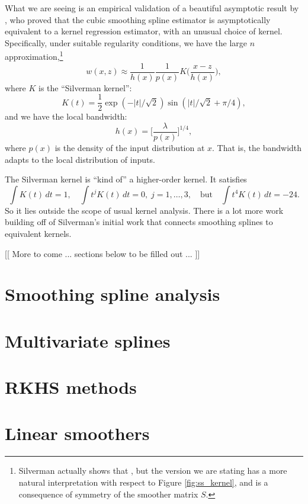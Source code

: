 \documentclass{article}
\begin{document}
What we are seeing is an empirical validation of a beautiful asymptotic result
by \citet{silverman1984spline}, who proved that the cubic smoothing spline
estimator is asymptotically equivalent to a kernel regression estimator, with an 
unusual choice of kernel. Specifically, under suitable regularity conditions, we
have the large $n$ approximation,\footnote{Silverman actually shows that
  , but the version we are stating has a more natural interpretation
  with respect to Figure \ref{fig:ss_kernel}, and is a consequence of symmetry
  of the smoother matrix $S$.} 
\[
w(x, z) \approx \frac{1}{h(x)} \frac{1}{p(x)} K\bigg( \frac{x-z}{h(x)} \bigg), 
\]
where $K$ is the ``Silverman kernel'': 
\[
K(t) = \frac{1}{2} \exp(-|t|/\sqrt{2}) \sin(|t|/\sqrt{2} + \pi/4), 
\]
and we have the local bandwidth: 
\[
h(x) = \bigg[ \frac{\lambda}{p(x)} \bigg]^{1/4},
\]
where $p(x)$ is the density of the input distribution at $x$. That is, the
bandwidth adapts to the local distribution of inputs. 

The Silverman kernel is ``kind of'' a higher-order kernel. It satisfies 
\[
\int K(t) \, dt = 1, \quad
\int t^j K(t) \, dt = 0, \; j=1,\dots,3, 
\quad \text{but} \quad 
\int t^4 K(t) \, dt = -24.
\]
So it lies outside the scope of usual kernel analysis. There is a lot more work
building off of Silverman's initial work that connects smoothing splines to
equivalent kernels. 

[[ More to come ... sections below to be filled out ... ]]

\section{Smoothing spline analysis}

\section{Multivariate splines}

\section{RKHS methods}

\section{Linear smoothers}



\end{document}
